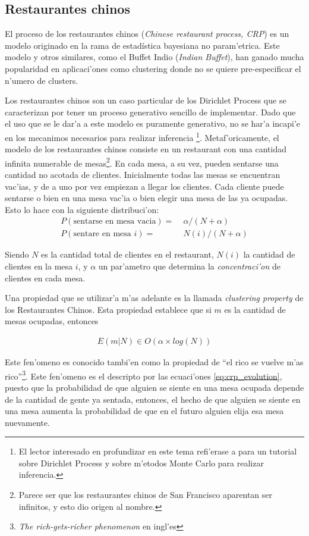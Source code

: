 \subsection{Restaurantes chinos}
El proceso de los restaurantes chinos (\emph{Chinese restaurant process, CRP}) es un modelo originado en la rama de estad\'istica bayesiana no param'etrica.
Este modelo y otros similares, como el Buffet Indio (\emph{Indian Buffet}), han ganado mucha popularidad en aplicaci'ones como clustering donde no se quiere
pre-especificar el n'umero de clusters.

Los restaurantes chinos son un caso particular de los Dirichlet Process que se caracterizan por tener un proceso generativo sencillo de implementar.
Dado que el uso que se le dar'a a este modelo es puramente generativo, no se har'a incapi'e en los mecanimos necesarios para realizar inferencia
\footnote{El lector interesado en profundizar en este tema refi'erase a \cite{Teh2007} para un tutorial sobre Dirichlet Process y \cite{neal2000markov} sobre m'etodos Monte Carlo para realizar inferencia.}.
Metaf'oricamente, el modelo de los restaurantes chinos consiste en un restaurant con una cantidad infinita numerable de mesas\footnote{Parece ser que los restaurantes chinos de San Francisco aparentan ser infinitos, y esto dio origen al nombre.}. 
En cada mesa, a su vez, pueden sentarse una cantidad no acotada de clientes. Inicialmente todas las mesas se encuentran vac'ias, 
y de a uno por vez empiezan a llegar los clientes. Cada cliente puede sentarse o bien en una mesa vac'ia o bien elegir una mesa de las ya ocupadas. 
Esto lo hace con la siguiente distribuci'on:
\begin{align}
\label{eq:crp_evolution}
P(\text{sentarse en mesa vacia}) =&\; \alpha/(N + \alpha)\\
P(\text{sentare en mesa } i) =&\; N(i)/(N + \alpha)
\end{align}

Siendo $N$ es la cantidad total de clientes en el restaurant, $N(i)$ la cantidad de clientes en la mesa $i$, y $\alpha$ un 
par'ametro que determina la \emph{concentraci'on} de clientes en cada mesa. 

Una propiedad que se utilizar'a m'as adelante es la llamada \emph{clustering property} de los Restaurantes Chinos.
Esta propiedad establece que si $m$ es la cantidad de mesas ocupadas, entonces

\begin{align}
\label{eq:crp_clustering}
E(m|N) \in O(\alpha\times log(N))
\end{align}

Este fen'omeno es conocido tambi'en como la propiedad de ``el rico se vuelve m'as rico''\footnote{\emph{The rich-gets-richer phenomenon} en ingl'es}. Este fen'omeno es el descripto por
las ecuaci'ones \ref{eq:crp_evolution}, puesto que la probabilidad de que alguien se siente en una mesa ocupada depende de la cantidad de gente ya sentada, entonces, el hecho
de que alguien se siente en una mesa aumenta la probabilidad de que en el futuro alguien elija esa mesa nuevamente.
